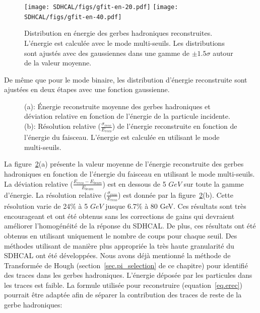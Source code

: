 \begin{figure}[!h]
  \begin{center}
    \texttt{[image: SDHCAL/figs/gfit-en-20.pdf]}
    \texttt{[image: SDHCAL/figs/gfit-en-40.pdf]}
    \caption{Distribution en énergie des gerbes hadroniques reconstruites. L'énergie est calculée avec le mode multi-seuils. Les distributions sont ajustés avec des gaussiennes dans une gamme de $\pm1.5\sigma$ autour de la valeur moyenne.}
    \label{fig:energy_dist_sd}
  \end{center}
\end{figure}
De même que pour le mode binaire, les distribution d'énergie reconstruite sont ajustées en deux étapes avec une fonction gaussienne. 
\begin{figure}[!h]
  \begin{center}
    \caption{(a): Énergie reconstruite moyenne des gerbes hadroniques et déviation relative en fonction de l'énergie de la particule incidente. (b): Résolution relative ($\frac{\sigma_{reco}}{E_{reco}}$) de l'énergie reconstruite en fonction de l'énergie du faisceau. L'énergie est calculée en utilisant le mode multi-seuils.}
    \label{fig:energy_sd}
  \end{center}
\end{figure}
La figure~\ref{fig:energy_sd}(a) présente la valeur moyenne de l'énergie reconstruite des gerbes hadroniques en fonction de l'énergie du faisceau en utilisant le mode multi-seuils. La déviation relative ($\frac{E_{reco}-E_{beam}}{E_{beam}}$) est en dessous de 5 $GeV$ sur toute la gamme d'énergie. La résolution relative ($\frac{\sigma_{reco}}{E_{reco}}$) est donnée par la figure~\ref{fig:energy_sd}(b). Cette résolution varie de 24$\%$ à 5 $GeV$ jusque 6.7$\%$ à 80 GeV. Ces résultats sont très encourageant et ont été obtenus sans les corrections de gains qui devraient améliorer l'homogénéité de la réponse du SDHCAL. De plus, ces résultats ont été obtenus en utilisant uniquement le nombre de coups pour chaque seuil. Des méthodes utilisant de manière plus appropriée la très haute granularité du SDHCAL ont été développées. Nous avons déjà mentionné la méthode de Transformée de Hough (section~\ref{sec.pi_selection} de ce chapitre) pour identifié des traces dans les gerbes hadroniques. L'énergie déposée par les particules dans les traces est faible. La formule utilisée pour reconstruire (equation~\ref{eq.erec}) pourrait être adaptée afin de séparer la contribution des traces de reste de la gerbe hadroniques:
